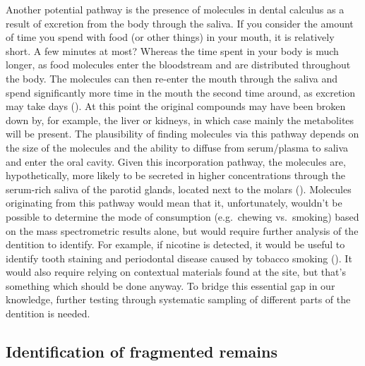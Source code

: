 \documentclass[
  b5paper,
]{book}
\begin{document}
Another potential pathway is the presence of molecules in dental
calculus as a result of excretion from the body through the saliva. If
you consider the amount of time you spend with food (or other things) in
your mouth, it is relatively short. A few minutes at most? Whereas the
time spent in your body is much longer, as food molecules enter the
bloodstream and are distributed throughout the body. The molecules can
then re-enter the mouth through the saliva and spend significantly more
time in the mouth the second time around, as excretion may take days
(). At this point the
original compounds may have been broken down by, for example, the liver
or kidneys, in which case mainly the metabolites will be present. The
plausibility of finding molecules via this pathway depends on the size
of the molecules and the ability to diffuse from serum/plasma to saliva
and enter the oral cavity. Given this incorporation pathway, the
molecules are, hypothetically, more likely to be secreted in higher
concentrations through the serum-rich saliva of the parotid glands,
located next to the molars (). Molecules originating from this pathway would mean that
it, unfortunately, wouldn't be possible to determine the mode of
consumption (e.g.~chewing vs.~smoking) based on the mass spectrometric
results alone, but would require further analysis of the dentition to
identify. For example, if nicotine is detected, it would be useful to
identify tooth staining and periodontal disease caused by tobacco
smoking ().
It would also require relying on contextual materials found at the site,
but that's something which should be done anyway. To bridge this
essential gap in our knowledge, further testing through systematic
sampling of different parts of the dentition is needed.

\subsection{Identification of fragmented
remains}\label{identification-of-fragmented-remains}
\end{document}
